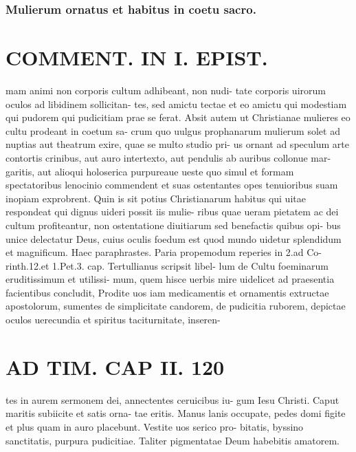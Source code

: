 \documentclass{article}
\begin{document}
\begin{pages}
\subsubsection*{Mulierum ornatus et habitus in coetu sacro. }
\section*{COMMENT. IN I. EPIST. }\pstart mam animi non corporis cultum adhibeant, non nudi- tate corporis uirorum oculos ad libidinem sollicitan- tes, sed amictu tectae et eo amictu qui modestiam qui pudorem qui pudicitiam prae se ferat. Absit autem ut Christianae mulieres eo cultu prodeant in coetum sa- crum quo uulgus prophanarum mulierum solet ad nuptias aut theatrum exire, quae se multo studio pri- us ornant ad speculum arte contortis crinibus, aut auro intertexto, aut pendulis ab auribus collonue mar- garitis, aut alioqui holoserica purpureaue ueste quo simul et formam spectatoribus lenocinio commendent et suas ostentantes opes tenuioribus suam inopiam exprobrent. Quin is sit potius Christianarum habitus qui uitae respondeat qui dignus uideri possit iis mulie- ribus quae ueram pietatem ac dei cultum profiteantur, non ostentatione diuitiarum sed benefactis quibus opi- bus unice delectatur Deus, cuius oculis foedum est quod mundo uidetur splendidum et magnificum. Haec paraphrastes. Paria propemodum reperies in 2.ad Co- rinth.12.et 1.Pet.3. cap. Tertullianus scripsit libel- lum de Cultu foeminarum eruditissimum et utilissi- mum, quem hisce uerbis mire uidelicet ad praesentia facientibus concludit, Prodite uos iam medicamentis et ornamentis extructae apostolorum, sumentes de simplicitate candorem, de pudicitia ruborem, depictae oculos uerecundia et spiritus taciturnitate, inseren-  \pend
\section*{AD TIM. CAP II. 120 }\pstart tes in aurem sermonem dei, annectentes ceruicibus iu- gum Iesu Christi. Caput maritis subiicite et satis orna- tae eritis. Manus lanis occupate, pedes domi figite et plus quam in auro placebunt. Vestite uos serico pro- bitatis, byssino sanctitatis, purpura pudicitiae. Taliter pigmentatae Deum habebitis amatorem.  \pend 
{}
{}

\end{pages}
\end{document}
